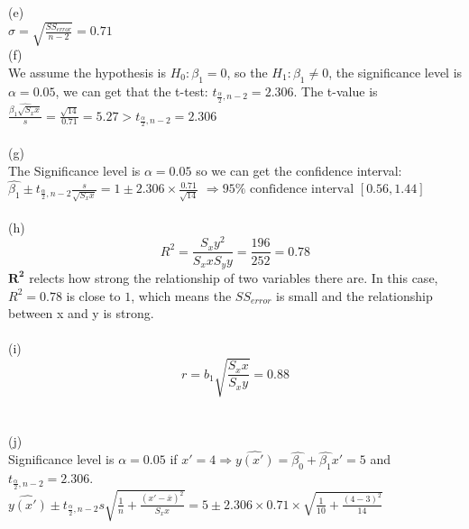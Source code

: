 \documentclass[11pt]{article}
\begin{document}
    \\
    \\
    (e) \\
      $\sigma = \sqrt{\frac{SS_{error}}{n-2}} = 0.71$
    \\
    (f) \\
      We assume the hypothesis is $H_0: \beta_1 = 0$, so the $H_1: \beta_1 \neq 0$, the significance level is $\alpha = 0.05$, we can get that the t-test: $t_{\frac{\alpha}{2}, n-2} = 2.306$. The t-value is $\frac{\hat{\beta_1\sqrt{S_xx}}}{s} = \frac{\sqrt{14}}{0.71} = 5.27 > t_{\frac{\alpha}{2}, n-2} = 2.306$
    \\
    \\
    (g) \\
    The Significance level is $\alpha = 0.05$ so we can get the confidence interval: $\hat{\beta_1} \pm t_{\frac{\alpha}{2}, n-2} \frac{s}{\sqrt{S_xx}} = 1 \pm 2.306 \times \frac{0.71}{\sqrt{14}}$ $\Rightarrow 95\% \text{ confidence interval } [0.56,1.44]$
    \\
    \\
    (h) \\
    $$R^2 = \frac{S_xy^2}{S_xx S_yy} = \frac{196}{252} = 0.78$$
    $\mathbf{R^2}$ relects how strong the relationship of two variables there are. In this case, $R^2 =0.78$ is close to $1$, which means the $SS_{error}$ is small and the relationship between x and y is strong.
    \\
    \\
    (i) \\
    $$r = b_1 \sqrt{\frac{S_xx}{S_xy}} = 0.88$$
    \\
    \\
    (j) \\
    Significance level is $\alpha = 0.05$ if $x' = 4 \Rightarrow \hat{y(x')} = \hat{\beta_0}+ \hat{\beta_1}x' = 5$ and $t_{\frac{\alpha}{2}, n-2} = 2.306$. \\
    $\hat{y(x')} \pm t_{\frac{\alpha}{2}, n-2} s \sqrt{\frac{1}{n} + \frac{(x'-\overline{x})^2}{S_xx}} = 5 \pm 2.306 \times 0.71 \times \sqrt{\frac{1}{10} + \frac{(4 - 3)^2}{14}}$ \\
\end{document}
